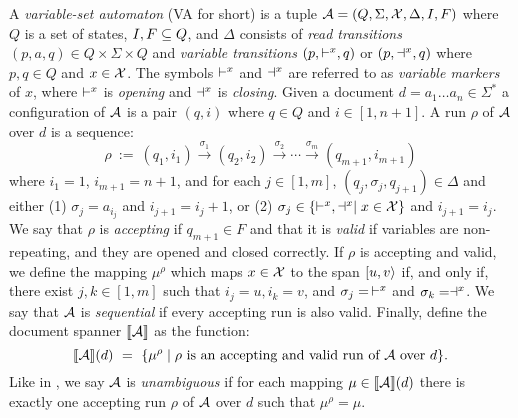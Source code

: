 A {\it variable-set automaton} (VA for short) is a tuple $\mathcal{A} = (Q, \Sigma, \mathcal{X}, \Delta, I, F)$ where $Q$ is a set of states, $I,F\subseteq Q$, and $\Delta$ consists of {\it read transitions} $(p,a,q)\in Q\times\Sigma\times Q$ and {\it variable transitions} $(p, \vdash^{x}, q)$ or $(p,\dashv^{x},q)$ where $p, q\in Q$ and $x\in \mathcal{X}$.
The symbols $\vdash^{x}$ and $\dashv^{x}$ are referred to as {\it variable markers} of $x$, where $\vdash^{x}$ is {\it opening} and $\dashv^{x}$ is {\it closing}. Given a document $d = a_1\ldots a_n \in \Sigma^*$ a configuration of $\mathcal{A}$ is a pair $(q,i)$ where $q\in Q$ and $i\in [1, n+1]$. 
A run $\rho$ of $\mathcal{A}$ over $d$ is a sequence:
\[
\rho \ := \ (q_1, i_1)\xrightarrow{\sigma_1} (q_2,i_2) \xrightarrow{\sigma_2}\cdots\xrightarrow{\sigma_m}(q_{m+1}, i_{m+1})
\] 
where $i_1 = 1$, $i_{m+1} = n+1$, and for each $j\in[1,m]$, $(q_j, \sigma_{j},q_{j+1}) \in \Delta$ and either 
(1) $\sigma_{j} = a_{i_j}$ and $i_{j+1} = i_j + 1$, or (2) $\sigma_{j}\in \{\vdash^{x} , \dashv^{x}\mid x\in\mathcal{X}\}$ and $i_{j+1} = i_j$. We say that $\rho$ is {\it accepting} if $q_{m+1}\in F$ and that it is {\it valid} if variables are non-repeating, and they are opened and closed correctly. 
If $\rho$ is accepting and valid, we define the mapping $\mu^\rho$ which maps $x\in \mathcal{X}$ to the span $[u,v\rangle$ if, and only if, there exist $j,k\in[1,m]$ such that $i_j = u, i_k = v$, and $\sigma_j =\, \vdash^{x}$ and $\sigma_k = \dashv^{x}$. We say that $\mathcal{A}$ is {\it sequential} if every accepting run is also valid. Finally, define the document spanner ${\llbracket{\mathcal{A}}\rrbracket}$ as the function:
\[
{\llbracket{\mathcal{A}}\rrbracket}(d) \ = \  \{\mu^\rho\mid \rho \text{ is an accepting and valid run of $\mathcal{A}$ over $d$}\}.
\] 
Like in \rts, we say $\mathcal{A}$ is {\it unambiguous} if for each mapping $\mu\in{\llbracket{\mathcal{A}}\rrbracket}(d)$ there is exactly one accepting run $\rho$ of $\mathcal{A}$ over $d$ such that $\mu^\rho = \mu$.

